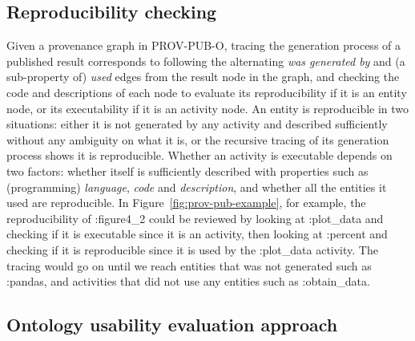 \subsection{Reproducibility checking}
Given a provenance graph in PROV-PUB-O, tracing the generation process of a published result corresponds to following the alternating \emph{was generated by} and (a sub-property of) \emph{used} edges from the result node in the graph, and checking the code and descriptions of each node to evaluate its reproducibility if it is an entity node, or its executability if it is an activity node. An entity is reproducible in two situations: either it is not generated by any activity and described sufficiently without any ambiguity on what it is, or the recursive tracing of its generation process shows it is reproducible. Whether an activity is executable depends on two factors: whether itself is sufficiently described with properties such as (programming) \emph{language}, \emph{code} and \emph{description}, and whether all the entities it used are reproducible. In Figure~\ref{fig:prov-pub-example}, for example, the reproducibility of :figure4\_2 could be reviewed by looking at :plot\_data and checking if it is executable since it is an activity, then looking at :percent and checking if it is reproducible since it is used by the :plot\_data activity. The tracing would go on until we reach entities that was not generated such as :pandas, and activities that did not use any entities such as :obtain\_data.






\subsection{Ontology usability evaluation approach}
\label{subsec:evaluation}

